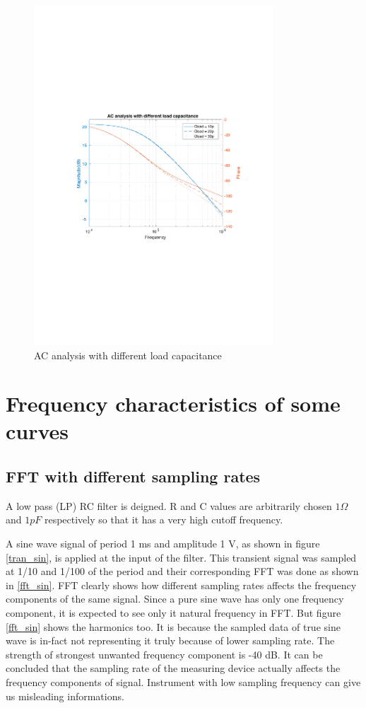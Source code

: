 \documentclass[12pt,a4paper,UKenglish]{article}
\begin{document}
\begin{figure} [H]
  \centering 
  \includegraphics[width=0.8\textwidth]{img/1d.pdf} 
  \caption{AC analysis with different load capacitance}
  \label{ac_cload} 
\end{figure}

\section{Frequency characteristics of some curves}
\subsection{FFT with different sampling rates}

A low pass (LP) RC filter is deigned. R and C values are arbitrarily chosen $1 \Omega$ and $1pF$ respectively so that it has a very high cutoff frequency. 

A sine wave signal of period 1 ms and amplitude 1 V, as shown in figure \ref{tran_sin}, is applied at the input of the filter. This transient signal was sampled at 1/10 and 1/100 of the period and their corresponding FFT was done as shown in \ref{fft_sin}. FFT clearly shows how different sampling rates affects the frequency components of the same signal. Since a pure sine wave has only one frequency component, it is expected to see only it natural frequency in FFT. But figure  \ref{fft_sin} shows the harmonics too. It is because the sampled data of true sine wave is in-fact not representing it truly because of lower sampling rate. The strength of  strongest unwanted frequency component is -40 dB.  It can be concluded that the sampling rate of the measuring device actually affects the frequency components of signal. Instrument with low sampling frequency can give us misleading informations.
\end{document}
